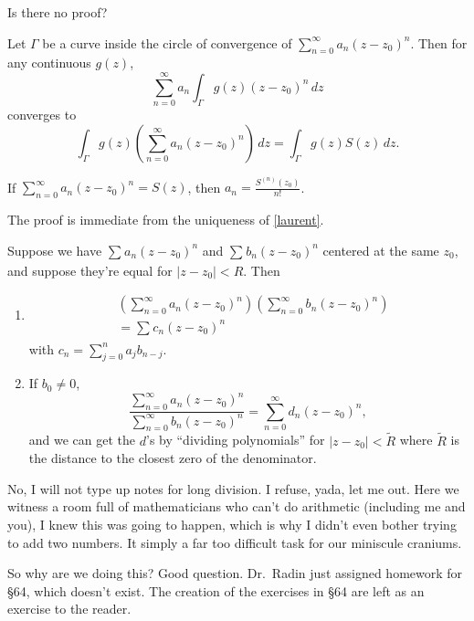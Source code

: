 Is there no proof?
\begin{theorem}
    Let $\Gamma $ be a curve inside the circle of convergence of $\sum_{n=0}^{\infty} a_n (z-z_0)^n $. Then for any continuous $g(z)$, \[
        \sum_{n=0}^{\infty} a_n \int_{\Gamma}^{} g(z)(z-z_0)^n  \, dz
    \] converges to \[
    \int_{\Gamma}^{} g(z)\left( \sum_{n=0}^{\infty} a_n (z-z_0)^n  \right)  \, dz=\int_{\Gamma}^{} g(z)S(z) \, dz.
    \] 
\end{theorem}
\begin{theorem}
    If $\sum_{n=0}^{\infty} a_n (z-z_0)^n =S(z)$, then $a_n =\frac{S^{(n)}(z_0)}{n!}$.
\end{theorem}
The proof is immediate from the uniqueness of \cref{laurent}.
\begin{cor}
    Suppose we have $\sum_{}^{} a_n (z-z_0)^n $ and $\sum_{}^{} b_n (z-z_0)^n $ centered at the same $z_0$, and suppose they're equal for $|z-z_0|<R$. Then
    \begin{enumerate}
        \item \begin{align*}
&\left( \sum_{n=0}^{\infty} a_n (z-z_0)^n \right)\left( \sum_{n=0}^{\infty} b_n (z-z_0)^n  \right)\\
&=\sum_{}^{} c_n (z-z_0)^n 
            \end{align*}   with $c_n =\sum_{j=0}^{n} a_j b_{n-j}$.
        \item If $b_0\neq 0$, \[
                \frac{\sum_{n=0}^{\infty} a_n (z-z_0)^n }{\sum_{n=0}^{\infty} b_n (z-z_0)^n }=\sum_{n=0}^{\infty} d_n (z-z_0)^n ,
        \] and we can get the $d$'s by ``dividing polynomials'' for $|z-z_0|<\widetilde R$ where $\widetilde R$ is the distance to the closest zero of the denominator.
    \end{enumerate}
\end{cor}
No, I will not type up notes for long division. I refuse, yada, let me out. Here we witness a room full of mathematicians who can't do arithmetic (including me and you), I knew this was going to happen, which is why I didn't even bother trying to add two numbers. It simply a far too difficult task for our miniscule craniums.

So why are we doing this? Good question. Dr.\ Radin just assigned homework for \S 64, which doesn't exist. The creation of the exercises in \S 64 are left as an exercise to the reader.

